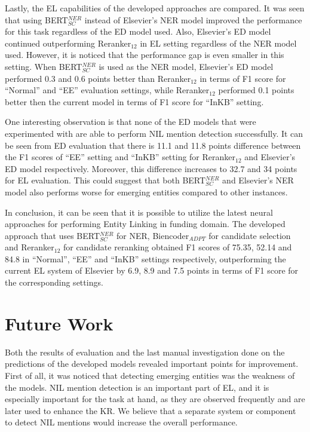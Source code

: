 \documentclass{report}
\theoremstyle{definition}
\theoremstyle{remark}
\begin{document}
Lastly, the EL capabilities of the developed approaches are compared. It was seen that using BERT$^{NER}_{SC}$ instead of Elsevier's NER model improved the performance for this task regardless of the ED model used. Also, Elsevier's ED model continued outperforming Reranker$_{12}$ in EL setting regardless of the NER model used. However, it is noticed that the performance gap is even smaller in this setting. When BERT$^{NER}_{SC}$ is used as the NER model, Elsevier's ED model performed 0.3 and 0.6 points better than Reranker$_{12}$ in terms of F1 score for ``Normal'' and ``EE'' evaluation settings, while Reranker$_{12}$ performed 0.1 points better then the current model in terms of F1 score for ``InKB'' setting.

One interesting observation is that none of the ED models that were experimented with are able to perform NIL mention detection successfully. It can be seen from ED evaluation that there is 11.1 and 11.8 points difference between the F1 scores of ``EE'' setting and ``InKB'' setting for Reranker$_{12}$ and Elsevier's ED model respectively. Moreover, this difference increases to 32.7 and 34 points for EL evaluation. This could suggest that both BERT$^{NER}_{SC}$ and Elsevier's NER model also performs worse for emerging entities compared to other instances.

In conclusion, it can be seen that it is possible to utilize the latest neural approaches for performing Entity Linking in funding domain. The developed approach that uses BERT$^{NER}_{SC}$ for NER, Biencoder$_{ADPT}$ for candidate selection and Reranker$_{12}$ for candidate reranking obtained F1 scores of 75.35, 52.14 and 84.8 in ``Normal'', ``EE'' and ``InKB'' settings respectively, outperforming the current EL system of Elsevier by 6.9, 8.9 and 7.5 points in terms of F1 score for the corresponding settings.

\section{Future Work}

Both the results of evaluation and the last manual investigation done on the predictions of the developed models revealed important points for improvement. First of all, it was noticed that detecting emerging entities was the weakness of the models. NIL mention detection is an important part of EL, and it is especially important for the task at hand, as they are observed frequently and are later used to enhance the KR. We believe that a separate system or component to detect NIL mentions would increase the overall performance.
\end{document}
